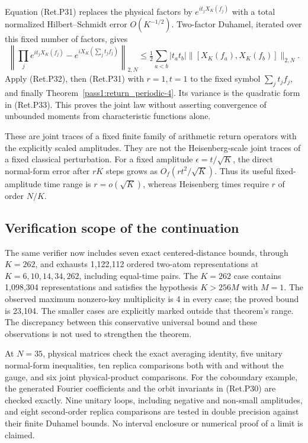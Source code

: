 Equation (Ret.P31) replaces the physical factors by \(e^{it_jX_K(f_j)}\)
with a total normalized Hilbert--Schmidt error \(O(K^{-1/2})\).
Two-factor Duhamel, iterated over this fixed number of factors, gives
\[
 \left\|\prod_j e^{it_jX_K(f_j)}
          -e^{iX_K(\sum_jt_jf_j)}\right\|_{2,N}
 \le\tfrac12\sum_{a<b}|t_at_b|
                       \|[X_K(f_a),X_K(f_b)]\|_{2,N}.
\]
Apply (Ret.P32), then (Ret.P31) with \(r=1,t=1\) to the fixed symbol
\(\sum_jt_jf_j\), and finally Theorem~\ref{pass1:return_periodic-4}. Its variance is the quadratic
form in (Ret.P33). This proves the joint law without asserting convergence
of unbounded moments from characteristic functions alone.

These are joint traces of a fixed finite family of arithmetic return
operators with the explicitly scaled amplitudes. They are not the
Heisenberg-scale joint traces of a fixed classical perturbation.
For a fixed amplitude \(\epsilon=t/\sqrt K\), the direct normal-form
error after \(rK\) steps grows as \(O_f(rt^2/\sqrt K)\).
Thus its useful fixed-amplitude time range is \(r=o(\sqrt K)\),
whereas Heisenberg times require \(r\) of order \(N/K\).

\hypertarget{verification-scope-of-the-continuation}{%
\subsection{Verification scope of the continuation}\label{verification-scope-of-the-continuation}}

The same verifier now includes seven exact centered-distance bounds,
through \(K=262\), and exhausts 1,122,112 ordered two-atom representations
at \(K=6,10,14,34,262\), including equal-time pairs.
The \(K=262\) case contains 1,098,304 representations and satisfies
the hypothesis \(K>256M\) with \(M=1\). The observed maximum nonzero-key
multiplicity is 4 in every case; the proved bound is 23,104.
The smaller cases are explicitly marked outside that theorem's range.
The discrepancy between this conservative universal bound and these
observations is not used to strengthen the theorem.

At \(N=35\), physical matrices check the exact averaging identity,
five unitary normal-form inequalities, ten replica comparisons both
with and without the gauge, and six joint physical-product comparisons.
For the coboundary example, the generated Fourier coefficients and
the orbit invariants in (Ret.P30) are checked exactly. Nine unitary loops,
including negative and non-small amplitudes, and eight second-order
replica comparisons are tested in double precision against their finite
Duhamel bounds. No interval enclosure or numerical proof of a limit
is claimed.

